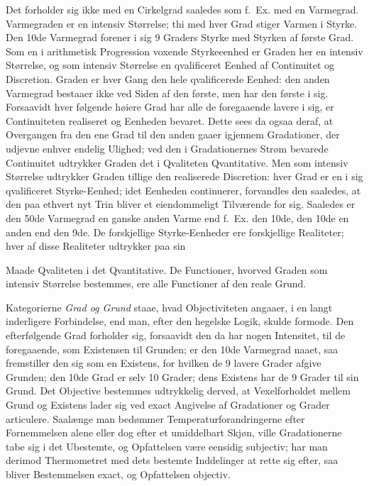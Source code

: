 \documentclass[12pt]{book}
\newcommand{\opage}[1]{\marginnote{\footnotesize\textit{[#1]}}}
\begin{document}
Det forholder sig ikke med en Cirkelgrad saaledes som f.\ Ex. med en Varmegrad. Varmegraden er en
intensiv Størrelse; thi med hver Grad stiger Varmen i Styrke. Den 10de Varmegrad forener i sig 9 Graders
Styrke med Styrken af første Grad. Som en i arithmetisk Progression voxende Styrkeeenhed er Graden her en
intensiv Størrelse, og som intensiv Størrelse en qvalificeret Eenhed af Continuitet og Discretion. Graden
er hver Gang den hele qvalificerede Eenhed: den anden Varmegrad bestaaer ikke ved Siden af den første,
men har den første i sig. Forsaavidt hver følgende høiere Grad har alle de foregaaende lavere i sig, er
Continuiteten realiseret og Eenheden bevaret. Dette sees da ogsaa deraf, at Overgangen fra den ene Grad
til den anden gaaer igjennem Gradationer, der udjevne enhver endelig Ulighed; ved den i Gradationernes
Strøm bevarede Continuitet udtrykker Graden det i Qvaliteten Qvantitative. Men som intensiv Størrelse
udtrykker Graden tillige den realiserede Discretion: hver Grad er en i sig qvalificeret Styrke-Eenhed;
idet Eenheden continuerer, forvandles den saaledes, at den paa ethvert nyt Trin bliver et eiendommeligt
Tilværende for sig. Saaledes er den 50de Varmegrad en ganske anden Varme end f.\ Ex. den 10de, den 10de
en anden end den 9de. De forskjellige Styrke-Eenheder ere forskjellige Realiteter; hver af disse
Realiteter udtrykker paa sin

\opage{311} Maade Qvaliteten i det Qvantitative. De Functioner, hvorved Graden som intensiv Størrelse bestemmes,
ere alle Functioner af den reale Grund.

Kategorierne \emph{Grad og Grund} staae, hvad Objectiviteten angaaer, i en langt inderligere
Forbindelse, end man, efter den hegelske Logik, skulde formode. Den efterfølgende Grad forholder sig,
forsaavidt den da har nogen Intensitet, til de foregaaende, som Existensen til Grunden; er den 10de
Varmegrad naaet, saa fremstiller den sig som en Existens, for hvilken de 9 lavere Grader afgive
Grunden; den 10de Grad er selv 10 Grader; dens Existens har de 9 Grader til sin Grund. Det Objective
bestemmes udtrykkelig derved, at Vexelforholdet mellem Grund og Existens lader sig ved exact Angivelse
af Gradationer og Grader articulere. Saalænge man bedømmer Temperaturforandringerne efter Fornemmelsen
alene eller dog efter et umiddelbart Skjøn, ville Gradationerne tabe sig i det Ubestemte, og
Opfattelsen være eensidig subjectiv; har man derimod Thermometret med dets bestemte Inddelinger at rette
sig efter, saa bliver Bestemmelsen exact, og Opfattelsen objectiv.
\end{document}
